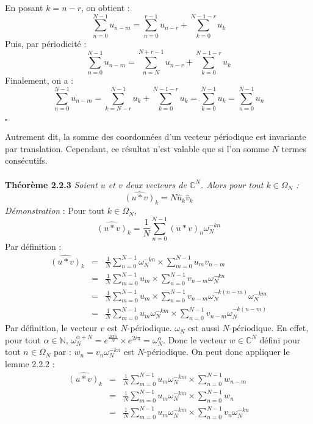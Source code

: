 \documentclass[12pt]{article}
\begin{document}
En posant $k=n-r$, on obtient : 
\begin{equation*}
\sum_{n=0}^{N-1}u_{n-m}=\sum_{n=0}^{r-1}u_{n-r}+\sum_{k=0}^{N-1-r}u_{k}
\end{equation*}
Puis, par périodicité :
\begin{equation*}
\sum_{n=0}^{N-1}u_{n-m}=\sum_{n=N}^{N+r-1}u_{n-r}+\sum_{k=0}^{N-1-r}u_{k}
\end{equation*}Finalement, on a :
\begin{equation*}
\sum_{n=0}^{N-1}u_{n-m}=\sum_{k=N-r}^{N-1}u_{k}+\sum_{k=0}^{N-1-r}u_{k}=\sum_{k=0}^{N-1}u_{k}=\sum_{n=0}^{N-1}u_{n}
\end{equation*}\begin{flushright} $\square$ \end{flushright}
Autrement dit, la somme des coordonnées d'un vecteur périodique est invariante par translation. Cependant, ce résultat n'est valable que si l'on somme $N$ termes consécutifs.\\\\
\textbf{Théorème 2.2.3} \textit{Soient $u$ et $v$ deux vecteurs de $\mathbb{C}^N$. Alors pour tout $k \in \Omega_N$ :\begin{equation}
\widehat{(u\ast v)}_k=N\hat{u}_k\hat{v}_k
\end{equation}}
\textit{Démonstration} : Pour tout $k\in \Omega_N$, \begin{equation*}
\widehat{(u\ast v)}_k=\frac{1}{N}\sum_{n=0}^{N-1}(u\ast v)_n\omega_N^{-kn}
\end{equation*}
Par définition :\begin{eqnarray*}
\widehat{(u\ast v)}_k&=&\frac{1}{N}\sum_{n=0}^{N-1}\omega_N^{-kn}\times \sum_{m=0}^{N-1}u_mv_{n-m}\\
&=&\frac{1}{N}\sum_{m=0}^{N-1}u_m\times \sum_{n=0}^{N-1}v_{n-m}\omega_N^{-kn}\nonumber\\
&=&\frac{1}{N}\sum_{m=0}^{N-1}u_m\times \sum_{n=0}^{N-1}v_{n-m}\omega_N^{-k(n-m)}\omega_N^{-km}\\
&=&\frac{1}{N}\sum_{m=0}^{N-1}u_m\omega_N^{-km}\times \sum_{n=0}^{N-1}v_{n-m}\omega_N^{-k(n-m)}
\end{eqnarray*}
Par définition, le vecteur $v$ est $N$-périodique. $\omega_N$ est aussi $N$-périodique. En effet, pour tout $\alpha\in \mathbb{N}$, $\omega_N^{\alpha+N} = e^{\frac{2i\pi\alpha}{N}}\times e^{2i\pi}=\omega_N^{\alpha}$.
Donc le vecteur $w\in\mathbb{C}^N$ défini pour tout $n\in\Omega_N$ par : $w_n=v_n\omega_N^{-kn}$ est $N$-périodique. On peut donc appliquer le lemme 2.2.2 :\begin{eqnarray*}
\widehat{(u\ast v)}_k&=&\frac{1}{N}\sum_{m=0}^{N-1}u_m\omega_N^{-km}\times \sum_{n=0}^{N-1}w_{n-m}\\
&=&\frac{1}{N}\sum_{m=0}^{N-1}u_m\omega_N^{-km}\times \sum_{n=0}^{N-1}w_n\nonumber\\
&=&\frac{1}{N}\sum_{m=0}^{N-1}u_m\omega_N^{-km}\times \sum_{n=0}^{N-1}v_n\omega_N^{-kn}
\end{eqnarray*}
\end{document}
